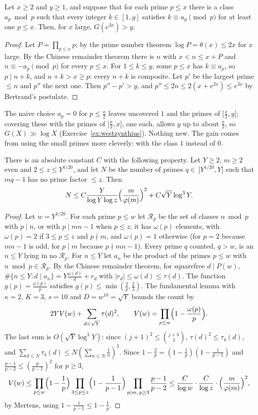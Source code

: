 \begin{lemma}\label{lem:covering}
Let $x\ge2$ and $y\ge1$, and suppose that for each prime $p\le x$ there is a class $a_p\bmod p$ such that every integer $k\in[1,y]$ satisfies $k\equiv a_p\pmod p$ for at least one $p\le x$. Then, for $x$ large, $G(e^{3x})>y$.
\end{lemma}
\begin{proof}
Let $P=\prod_{p\le x}p$; by the prime number theorem $\log P=\theta(x)\le2x$ for $x$ large. By the Chinese remainder theorem there is $n$ with $x<n\le x+P$ and $n\equiv-a_p\pmod p$ for every $p\le x$. For $1\le k\le y$, some $p\le x$ has $k\equiv a_p$, so $p\mid n+k$, and $n+k>x\ge p$: every $n+k$ is composite. Let $p'$ be the largest prime $\le n$ and $p''$ the next one. Then $p''-p'>y$, and $p''\le2n\le2(x+e^{2x})\le e^{3x}$ by Bertrand's postulate.
\end{proof}

The naive choice $a_p=0$ for $p\le\frac x2$ leaves uncovered $1$ and the primes of $]\frac x2,y]$; covering these with the primes of $]\frac x2,x]$, one each, allows $y$ up to about $\frac x2$, so $G(X)\gg\log X$ (Exercise~\ref{ex:westzynthius}). Nothing new. The gain comes from using the small primes more cleverly: with the class $1$ instead of $0$.

\begin{lemma}\label{lem:siftedprimes}
There is an absolute constant $C$ with the following property. Let $Y\ge2$, $m\ge2$ even and $2\le z\le Y^{1/20}$, and let $N$ be the number of primes $q\in\,]Y^{1/20},Y]$ such that $mq-1$ has no prime factor $\le z$. Then
\[
N\le C\frac{Y}{\log Y\log z}\Bigl(\frac m{\varphi(m)}\Bigr)^2+C\sqrt Y\log^3Y.
\]
\end{lemma}
\begin{proof}
Let $w=Y^{1/20}$. For each prime $p\le w$ let $\mathcal R_p$ be the set of classes $n\bmod p$ with $p\mid n$, or with $p\mid mn-1$ when $p\le z$; it has $\omega(p)$ elements, with $\omega(p)=2$ if $3\le p\le z$ and $p\nmid m$, and $\omega(p)=1$ otherwise (for $p=2$ because $mn-1$ is odd, for $p\mid m$ because $p\nmid mn-1$). Every prime $q$ counted, $q>w$, is an $n\le Y$ lying in no $\mathcal R_p$. For $n\le Y$ let $a_n$ be the product of the primes $p\le w$ with $n\bmod p\in\mathcal R_p$. By the Chinese remainder theorem, for squarefree $d\mid P(w)$, $\#\{n\le Y:d\mid a_n\}=Y\frac{\omega(d)}d+r_d$ with $|r_d|\le\omega(d)\le\tau(d)$. The function $g(p)=\frac{\omega(p)}p$ satisfies $g(p)\le\min(\frac2p,\frac23)$. The fundamental lemma with $\kappa=2$, $K=3$, $s=10$ and $D=w^{10}=\sqrt Y$ bounds the count by
\[
2YV(w)+\sum_{d<\sqrt Y}\tau(d)^2,\qquad V(w)=\prod_{p\le w}\Bigl(1-\frac{\omega(p)}p\Bigr).
\]
The last sum is $O(\sqrt Y\log^3Y)$: since $(j+1)^2\le\binom{j+3}3$, $\tau(d)^2\le\tau_4(d)$, and $\sum_{d\le N}\tau_4(d)\le N(\sum_{n\le N}\frac1n)^3$. Since $1-\frac2p=(1-\frac1p)(1-\frac1{p-1})$ and $\frac{p-1}{p-2}\le(\frac p{p-1})^2$ for $p\ge3$,
\[
V(w)\le\prod_{p\le w}\Bigl(1-\frac1p\Bigr)\prod_{3\le p\le z}\Bigl(1-\frac1{p-1}\Bigr)\prod_{p\mid m,\,p\ge3}\frac{p-1}{p-2}\le\frac C{\log w}\cdot\frac C{\log z}\cdot\Bigl(\frac m{\varphi(m)}\Bigr)^2,
\]
by Mertens, using $1-\frac1{p-1}\le1-\frac1p$.
\end{proof}


